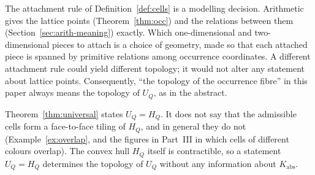 \begin{remark}\label{rem:modelling}
The attachment rule of Definition~\ref{def:cells} is a modelling decision. Arithmetic gives the lattice points (Theorem~\ref{thm:occ}) and the relations between them (Section~\ref{sec:arith-meaning}) exactly. Which one-dimensional and two-dimensional pieces to attach is a choice of geometry, made so that each attached piece is spanned by primitive relations among occurrence coordinates. A different attachment rule could yield different topology; it would not alter any statement about lattice points. Consequently, ``the topology of the occurrence fibre'' in this paper always means the topology of $U_Q$, as in the abstract.
\end{remark}

\begin{remark}
Theorem~\ref{thm:universal} states $U_Q=H_Q$. It does not say that the admissible cells form a face-to-face tiling of $H_Q$, and in general they do not (Example~\ref{ex:overlap}, and the figures in Part~III in which cells of different colours overlap). The convex hull $H_Q$ itself is contractible, so a statement $U_Q=H_Q$ determines the topology of $U_Q$ without any information about $K_{\mathrm{abs}}$.
\end{remark}
